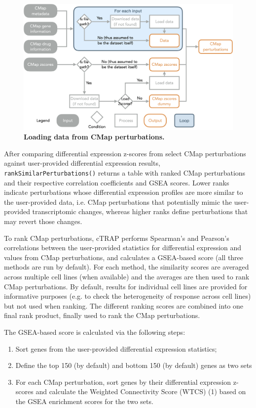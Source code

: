 \begin{figure}[!h]
  \includegraphics[width=1\textwidth]{images/ctrap/cmap-perturbations}
  \centering
  \caption[Loading data from CMap perturbations]{\textbf{Loading data from CMap perturbations.}}
  \label{fig:ctrap-cmap-perturbations}
\end{figure}

After comparing differential expression z-scores from select CMap perturbations against user-provided differential expression results, \texttt{rankSimilarPerturbations()} returns a table with ranked CMap perturbations and their respective correlation coefficients and GSEA scores. Lower ranks indicate perturbations whose differential expression profiles are more similar to the user-provided data, i.e. CMap perturbations that potentially mimic the user-provided transcriptomic changes, whereas higher ranks define perturbations that may revert those changes.

To rank CMap perturbations, cTRAP performs Spearman's and Pearson's correlations between the user-provided statistics for differential expression and values from CMap perturbations, and calculates a GSEA-based score (all three methods are run by default). For each method, the similarity scores are averaged across multiple cell lines (when available) and the averages are then used to rank CMap perturbations. By default, results for individual cell lines are provided for informative purposes (e.g. to check the heterogeneity of response across cell lines) but not used when ranking. The different ranking scores are combined into one final rank product, finally used to rank the CMap perturbations.

The GSEA-based score is calculated via the following steps:

\begin{enumerate}
	\item Sort genes from the user-provided differential expression statistics;
	\item Define the top 150 (by default) and bottom 150 (by default) genes as two sets
	\item For each CMap perturbation, sort genes by their differential expression z-scores and calculate the Weighted Connectivity Score (WTCS) (1) based on the GSEA enrichment scores for the two sets.
\end{enumerate}

